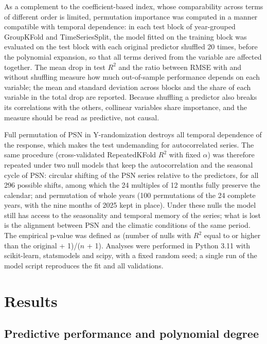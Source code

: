 \documentclass[a4paper,fleqn]{cas-sc}
\begin{document}
As a complement to the coefficient-based index, whose comparability across terms of different order is limited, permutation importance \citep{breiman2001} was computed in a manner compatible with temporal dependence: in each test block of year-grouped GroupKFold and TimeSeriesSplit, the model fitted on the training block was evaluated on the test block with each original predictor shuffled 20 times, before the polynomial expansion, so that all terms derived from the variable are affected together. The mean drop in test $R^2$ and the ratio between RMSE with and without shuffling measure how much out-of-sample performance depends on each variable; the mean and standard deviation across blocks and the share of each variable in the total drop are reported. Because shuffling a predictor also breaks its correlations with the others, collinear variables share importance, and the measure should be read as predictive, not causal.

Full permutation of PSN in Y-randomization destroys all temporal dependence of the response, which makes the test undemanding for autocorrelated series. The same procedure (cross-validated RepeatedKFold $R^2$ with fixed $\alpha$) was therefore repeated under two null models that keep the autocorrelation and the seasonal cycle of PSN: circular shifting of the PSN series relative to the predictors, for all 296 possible shifts, among which the 24 multiples of 12 months fully preserve the calendar; and permutation of whole years (100 permutations of the 24 complete years, with the nine months of 2025 kept in place). Under these nulls the model still has access to the seasonality and temporal memory of the series; what is lost is the alignment between PSN and the climatic conditions of the same period. The empirical p-value was defined as (number of nulls with $R^2$ equal to or higher than the original + 1)/($n$ + 1). Analyses were performed in Python 3.11 with scikit-learn, statsmodels and scipy, with a fixed random seed; a single run of the model script reproduces the fit and all validations.

\section{Results}\label{sec:results}

\subsection{Predictive performance and polynomial degree}
\end{document}
